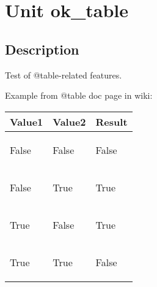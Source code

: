\documentclass{report}
\begin{document}
\label{toc}\tableofcontents
\newpage
\newlength{\tmplength}
\chapter{Unit ok{\_}table}
\label{ok_table}
\section{Description}
Test of @table{-}related features.\hfill\vspace*{1ex}



Example from @table doc page in wiki:



\begin{tabular}{|l|l|l|}
\hline
\textbf{Value1} & \textbf{Value2} & \textbf{Result} \\ \hline
\begin{ttfamily}False\end{ttfamily} & \begin{ttfamily}False\end{ttfamily} & \begin{ttfamily}False\end{ttfamily} \\ \hline
\begin{ttfamily}False\end{ttfamily} & \begin{ttfamily}True\end{ttfamily} & \begin{ttfamily}True\end{ttfamily} \\ \hline
\begin{ttfamily}True\end{ttfamily} & \begin{ttfamily}False\end{ttfamily} & \begin{ttfamily}True\end{ttfamily} \\ \hline
\begin{ttfamily}True\end{ttfamily} & \begin{ttfamily}True\end{ttfamily} & \begin{ttfamily}False\end{ttfamily} \\ \hline
\end{tabular}
\end{document}
